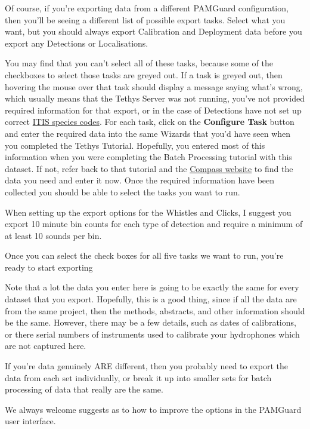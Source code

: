 \documentclass[
]{article}
\begin{document}
Of course, if you're exporting data from a different PAMGuard
configuration, then you'll be seeing a different list of possible export
tasks. Select what you want, but you should always export Calibration
and Deployment data before you export any Detections or Localisations.

You may find that you can't select all of these tasks, because some of
the checkboxes to select those tasks are greyed out. If a task is greyed
out, then hovering the mouse over that task should display a message
saying what's wrong, which usually means that the Tethys Server was not
running, you've not provided required information for that export, or in
the case of Detections have not set up correct
\href{https://www.pamguard.org/olhelp/utilities/tethys/docs/tethys_speciescodes.html}{ITIS
species codes}. For each task, click on the \textbf{Configure Task}
button and enter the required data into the same Wizards that you'd have
seen when you completed the Tethys Tutorial. Hopefully, you entered most
of this information when you were completing the Batch Processing
tutorial with this dataset. If not, refer back to that tutorial and the
\href{https://compass-oceanscience.eu/}{Compass website} to find the
data you need and enter it now. Once the required information have been
collected you should be able to select the tasks you want to run.

When setting up the export options for the Whistles and Clicks, I
suggest you export 10 minute bin counts for each type of detection and
require a minimum of at least 10 sounds per bin.

Once you can select the check boxes for all five tasks we want to run,
you're ready to start exporting

\begin{tcolorbox}[enhanced jigsaw, opacityback=0, rightrule=.15mm, bottomtitle=1mm, bottomrule=.15mm, title=\textcolor{quarto-callout-note-color}{\faInfo}\hspace{0.5em}{Configuration Differences}, toprule=.15mm, colbacktitle=quarto-callout-note-color!10!white, arc=.35mm, breakable, toptitle=1mm, colback=white, titlerule=0mm, opacitybacktitle=0.6, coltitle=black, left=2mm, colframe=quarto-callout-note-color-frame, leftrule=.75mm]

Note that a lot the data you enter here is going to be exactly the same
for every dataset that you export. Hopefully, this is a good thing,
since if all the data are from the same project, then the methods,
abstracts, and other information should be the same. However, there may
be a few details, such as dates of calibrations, or there serial numbers
of instruments used to calibrate your hydrophones which are not captured
here.

If you're data genuinely ARE different, then you probably need to export
the data from each set individually, or break it up into smaller sets
for batch processing of data that really are the same.

We always welcome suggests as to how to improve the options in the
PAMGuard user interface.

\end{tcolorbox}
\end{document}
